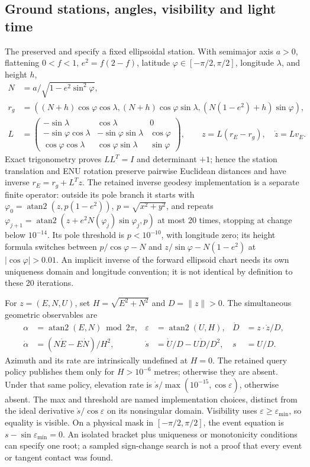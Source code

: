 \subsection{Ground stations, angles, visibility and light time}
\label{sec:lift-station}
The preserved  and  specify a fixed
ellipsoidal station. With semimajor axis $a>0$, flattening $0<f<1$,
$e^2=f(2-f)$, latitude $\varphi\in[-\pi/2,\pi/2]$, longitude $\lambda$, and height $h$,
\begin{align}
 N&=a/\sqrt{1-e^2\sin^2\varphi},\\
 r_g&=((N+h)\cos\varphi\cos\lambda,
 (N+h)\cos\varphi\sin\lambda,(N(1-e^2)+h)\sin\varphi),\\
 L&=\begin{pmatrix}-\sin\lambda&\cos\lambda&0\\
 -\sin\varphi\cos\lambda&-\sin\varphi\sin\lambda&\cos\varphi\\
 \cos\varphi\cos\lambda&\cos\varphi\sin\lambda&\sin\varphi\end{pmatrix},
 \qquad z=L(r_E-r_g),\quad \dot z=Lv_E .
\end{align}
Exact trigonometry proves $LL^T=I$ and determinant $+1$; hence the station
translation and ENU rotation preserve pairwise Euclidean distances and have
inverse $r_E=r_g+L^Tz$. The retained inverse geodesy implementation is a separate
finite operator: outside its pole branch it starts with
$\varphi_0=\operatorname{atan2}(z,p(1-e^2))$, $p=\sqrt{x^2+y^2}$, and repeats
$\varphi_{j+1}=\operatorname{atan2}(z+e^2N(\varphi_j)\sin\varphi_j,p)$ at most
20 times, stopping at change below $10^{-14}$. Its pole threshold is
$p<10^{-10}$, with longitude zero; its height formula switches between
$p/\cos\varphi-N$ and $z/\sin\varphi-N(1-e^2)$ at $|\cos\varphi|>0.01$.
An implicit inverse of the forward ellipsoid chart needs its own uniqueness
domain and longitude convention; it is not identical by definition to these
20 iterations.

For $z=(E,N,U)$, set $H=\sqrt{E^2+N^2}$ and $D=\|z\|>0$. The simultaneous
geometric observables are
\begin{align}
 \alpha&=\operatorname{atan2}(E,N)\bmod2\pi,&
 \varepsilon&=\operatorname{atan2}(U,H),&
 \dot D&=z\cdot\dot z/D,\\
 \dot\alpha&=(N\dot E-E\dot N)/H^2,&
 \dot s&=\dot U/D-U\dot D/D^2,&s&=U/D .
\end{align}
Azimuth and its rate are intrinsically undefined at $H=0$. The retained query
policy publishes them only for $H>10^{-6}$ metres; otherwise they are absent.
Under that same policy, elevation rate is
$\dot s/\max(10^{-15},\cos\varepsilon)$, otherwise absent. The max and threshold
are named implementation choices, distinct from the ideal derivative
$\dot s/\cos\varepsilon$ on its nonsingular domain. Visibility uses
$\varepsilon\ge\varepsilon_{\min}$, so equality is visible. On a physical mask
in $[-\pi/2,\pi/2]$, the event equation is $s-\sin\varepsilon_{\min}=0$.
An isolated bracket plus uniqueness or monotonicity conditions can specify one
root; a sampled sign-change search is not a proof that every event or tangent
contact was found.

